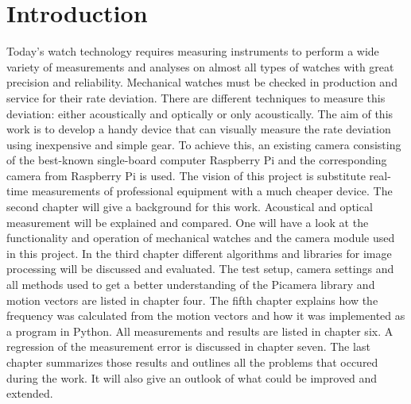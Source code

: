 \documentclass[12pt, a4paper]{report}
\begin{document}
\pagebreak
    \setcounter{secnumdepth}{5} 
    \setcounter{tocdepth}{5} 
    \tableofcontents
    \pagebreak
    
    \chapter{Introduction}
    Today's watch technology requires measuring instruments to perform a wide variety of measurements and analyses on almost all types of watches with great precision and reliability.
    Mechanical watches must be checked in production and service for their rate deviation.
    There are different techniques to measure this deviation: either acoustically and optically or only acoustically.
    \newline
    The aim of this work is to develop a handy device that can visually measure the rate deviation using inexpensive and simple gear.
    To achieve this, an existing camera consisting of the best-known single-board computer Raspberry Pi and the corresponding camera from Raspberry Pi is used.
    The vision of this project is substitute real-time measurements of professional equipment with a much cheaper device. 
    \newline
    The second chapter will give a background for this work. Acoustical and optical measurement will be explained and compared. One will have a look at the functionality and operation of mechanical watches and the camera module used in this project.
        \newline
    In the third chapter different algorithms and libraries for image processing will be discussed and evaluated. 
        \newline
    The test setup, camera settings and all methods used to get a better understanding of the Picamera library and motion vectors are listed in chapter four. 
        \newline
    The fifth chapter explains how the frequency was calculated from the motion vectors and how it was implemented as a program in Python. 
        \newline
    All measurements and results are listed in chapter six. A regression of the measurement error is discussed in chapter seven.
            \newline
    The last chapter summarizes those results and outlines all the problems that occured during the work. It will also give an outlook of what could be improved and extended.
\end{document}
